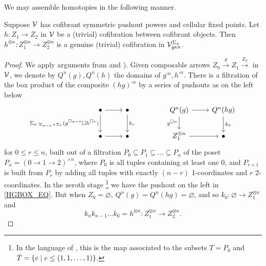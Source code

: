 \documentclass[a4paper,10pt
,draft
]{article}%
\renewcommand{\1}{\eta}%
\begin{document}


We may assemble homotopies in the following manner.

\begin{lemma}
      Suppose $\mathcal V$ has cofibrant symmetric pushout powers and cellular fixed points.
      Let $h: Z_1 \to Z_2$ in $\mathcal V$ be a (trivial) cofibration between cofibrant objects.
      Then $h^{\otimes n}: Z_1^{\otimes n} \to Z_2^{\otimes n}$ is a genuine (trivial) cofibration in $\mathcal V^{\Sigma_n}_{gen}$.
\end{lemma}
\begin{proof}
      We apply arguments from \cite[Prop. 6.24]{BP_geo} and \cite[Lemma 4.8]{Pe16}).
      Given composable arrows $Z_0 \xrightarrow{g} Z_1 \xrightarrow{Z_2}$ in $\mathcal V$,
      we denote by $Q^n(g), Q^n(h)$ the domains of $g^{\square n}, h^{\square n}$.
      There is a filtration of the box product of the composite $(hg)^{\square n}$ by a series of pushouts as on the left below
      \begin{equation}
            \label{HGBOX_EQ}
            \begin{tikzcd}
                  \bullet \arrow[d, "\Sigma_n \cdot_{\Sigma_{n-r} \times \Sigma_r} (g^{\square n-r} \square h^{\square r})"'] \arrow[r]
                  &
                  \bullet \arrow[d, "k_r"]
                  & &%
                  Q^n(g) \arrow[r] \arrow[d, "g^{\square n}"']
                  &
                  Q^n(hg) \arrow[d, "k_0"]
                  \\
                  \bullet \arrow[r]
                  &
                  \bullet
                  & &%
                  Z_1^{\otimes n} \arrow[r]
                  &
                  \bullet
            \end{tikzcd}
      \end{equation}
      for $0 \leq r \leq n$,
      built out of a filtration $P_0 \subseteq P_1 \subseteq \dots \subseteq P_n$ of the poset $P_n = (0 \to 1 \to 2)^{\times n}$,
      where $P_0$ is all tuples containing at least one 0, and
      $P_{r+1}$ is built from $P_r$ by adding all tuples with exactly $(n-r)$ 1-coordinates and $r$ 2-coordinates.
      In the zeroth stage \footnote{
        In the language of \cite[Lemma 4.8]{Pe16}, this is the map associated to the subsets
        $T = P_0$ and $\bar T = \left\{ e \;|\; e \leq (1,1,\dots,1)\right\}$.}
      we have the pushout on the left in \eqref{HGBOX_EQ}.
      But when $Z_0 = \varnothing$, $Q^n(g) = Q^n(hg) = \varnothing$, and so
      $k_0: \varnothing \to Z_1^{\otimes n}$ and
      \[
            k_n k_{n-1} \dots k_0 = h^{\otimes n}: Z_1^{\otimes n} \to Z_2^{\otimes n}.
      \]


\end{proof}
\end{document}
